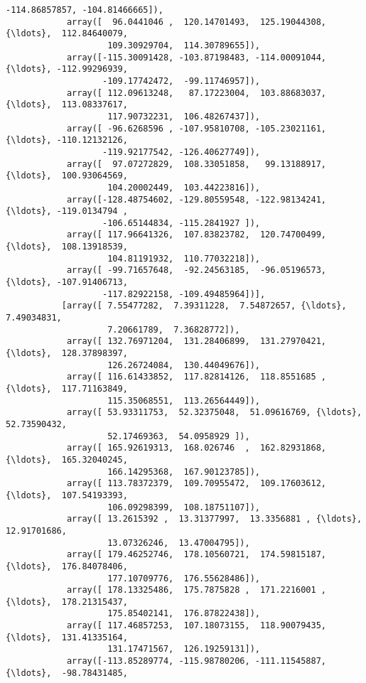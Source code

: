 \documentclass[11pt]{article}
\begin{document}
\begin{Verbatim}[commandchars=\\\{\}]
                   -114.86857857, -104.81466665]),
            array([  96.0441046 ,  120.14701493,  125.19044308, {\ldots},  112.84640079,
                    109.30929704,  114.30789655]),
            array([-115.30091428, -103.87198483, -114.00091044, {\ldots}, -112.99296939,
                   -109.17742472,  -99.11746957]),
            array([ 112.09613248,   87.17223004,  103.88683037, {\ldots},  113.08337617,
                    117.90732231,  106.48267437]),
            array([ -96.6268596 , -107.95810708, -105.23021161, {\ldots}, -110.12132126,
                   -119.92177542, -126.40627749]),
            array([  97.07272829,  108.33051858,   99.13188917, {\ldots},  100.93064569,
                    104.20002449,  103.44223816]),
            array([-128.48754602, -129.80559548, -122.98134241, {\ldots}, -119.0134794 ,
                   -106.65144834, -115.2841927 ]),
            array([ 117.96641326,  107.83823782,  120.74700499, {\ldots},  108.13918539,
                    104.81191932,  110.77032218]),
            array([ -99.71657648,  -92.24563185,  -96.05196573, {\ldots}, -107.91406713,
                   -117.82922158, -109.49485964])],
           [array([ 7.55477282,  7.39311228,  7.54872657, {\ldots},  7.49034831,
                    7.20661789,  7.36828772]),
            array([ 132.76971204,  131.28406899,  131.27970421, {\ldots},  128.37898397,
                    126.26724084,  130.44049676]),
            array([ 116.61433852,  117.82814126,  118.8551685 , {\ldots},  117.71163849,
                    115.35068551,  113.26564449]),
            array([ 53.93311753,  52.32375048,  51.09616769, {\ldots},  52.73590432,
                    52.17469363,  54.0958929 ]),
            array([ 165.92619313,  168.026746  ,  162.82931868, {\ldots},  165.32040245,
                    166.14295368,  167.90123785]),
            array([ 113.78372379,  109.70955472,  109.17603612, {\ldots},  107.54193393,
                    106.09298399,  108.18751107]),
            array([ 13.2615392 ,  13.31377997,  13.3356881 , {\ldots},  12.91701686,
                    13.07326246,  13.47004795]),
            array([ 179.46252746,  178.10560721,  174.59815187, {\ldots},  176.84078406,
                    177.10709776,  176.55628486]),
            array([ 178.13325486,  175.7875828 ,  171.2216001 , {\ldots},  178.21315437,
                    175.85402141,  176.87822438]),
            array([ 117.46857253,  107.18073155,  118.90079435, {\ldots},  131.41335164,
                    131.17471567,  126.19259131]),
            array([-113.85289774, -115.98780206, -111.11545887, {\ldots},  -98.78431485,

\end{Verbatim}
\end{document}
